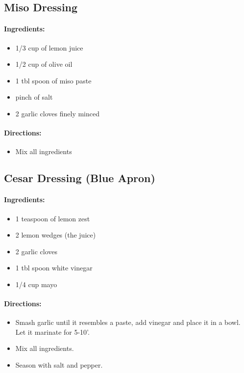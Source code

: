 \documentclass{article}
\begin{document}
\subsection{Miso Dressing}

\paragraph{Ingredients:}

\begin{itemize}
	\item 1/3 cup of lemon juice
	\item 1/2 cup of olive oil
	\item 1 tbl spoon of miso paste
	\item pinch of salt
	\item 2 garlic cloves finely minced
\end{itemize}

\paragraph{Directions:}
\begin{itemize}
	\item Mix all ingredients
\end{itemize}

\subsection{Cesar Dressing (Blue Apron)}

\paragraph{Ingredients:}

\begin{itemize}
	\item 1 teaspoon of lemon zest
	\item 2 lemon wedges (the juice)
	\item 2 garlic cloves
	\item 1 tbl spoon white vinegar
	\item 1/4 cup mayo
\end{itemize}

\paragraph{Directions:}
\begin{itemize}
	\item Smash garlic until it resembles a paste, add vinegar and place it in a bowl. Let it marinate for 5-10'. 
	\item Mix all ingredients.
	\item Season with salt and pepper.
\end{itemize}
\end{document}
